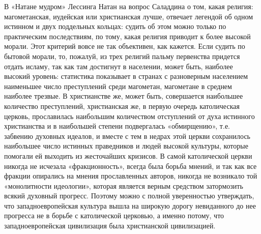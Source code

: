 В  «Натане мудром»  Лессинга Натан  на вопрос  Саладдина о  том, какая
религия:  магометанская, иудейская  или  христианская лучше,  отвечает
легендой  об  одном истинном  и  двух  поддельных кольцах:  судить  об
этом  можно  только  по  практическим  последствиям,  по  тому,  какая
религия  приводит  к более  высокой  морали.  Этот критерий  вовсе  не
так  объективен,  как кажется.  Если  судить  по бытовой  морали,  то,
пожалуй,  из трех  религий пальму  первенства придется  отдать исламу,
так  как  там достигнут  в  населении,  может быть,  наиболее  высокий
уровень:  статистика показывает  в  странах  с разноверным  населением
наименьшее число  преступлений среди  магометан, магометане  в среднем
наиболее  трезвые.   В  христианстве   же,  может   быть,  совершается
наибольшее   количество  преступлений,   христианская  же,   в  первую
очередь  католическая  церковь,  прославилась  наибольшим  количеством
отступлений  от духа  истинного  христианства и  в наибольшей  степени
подвергалась «обмирщению», т.е. забвению  духовных идеалов, и вместе с
тем  в  недрах  этой  церкви  сохранилось  наибольшее  число  истинных
праведников  и людей  высокой культуры,  которые помогали  ей выходить
из  жесточайших  кризисов.  В  самой католической  церкви  никогда  не
исчезала  «фракционность»,  всегда  была  борьба  мнений,  и  так  как
все  фракции опирались  на  мнения прославленных  авторов, никогда  не
возникало  той  «монолитности   идеологии»,  которая  является  верным
средством затормозить всякий духовный прогресс. Поэтому можно с полной
уверенностью  утверждать,  что  западноевропейская культура  вышла  на
широкую дорогу невиданного до нее прогресса не в борьбе с католической
церковью,  а именно  потому, что  западноевропейская цивилизация  была
христианской цивилизацией.

